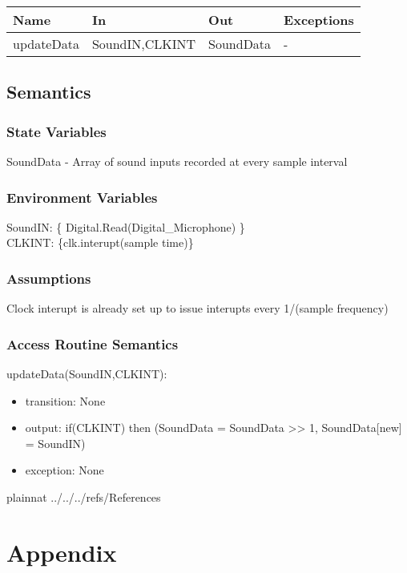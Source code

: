 \documentclass[12pt, titlepage]{article}
\begin{document}
\begin{center}
\begin{tabular}{p{2cm} p{4cm} p{4cm} p{2cm}}
\hline
\textbf{Name} & \textbf{In} & \textbf{Out} & \textbf{Exceptions} \\
\hline
updateData & SoundIN,CLKINT & SoundData & - \\
\hline
\end{tabular}
\end{center}

\subsection{Semantics}

\subsubsection{State Variables}

SoundData - Array of sound inputs recorded at every sample interval

\subsubsection{Environment Variables}

SoundIN: \{ Digital.Read(Digital\_Microphone) \}\\
CLKINT: \{clk.interupt(sample time)\}

\subsubsection{Assumptions}

Clock interupt is already set up to issue interupts every 1/(sample frequency) 

\subsubsection{Access Routine Semantics}

\noindent updateData(SoundIN,CLKINT):
\begin{itemize}
\item transition: None
\item output: if(CLKINT) then (SoundData = SoundData >> 1, SoundData[new] = SoundIN)
\item exception: None 
\end{itemize}


\newpage


 {plainnat}
 {../../../refs/References}

\section{Appendix} \label{Appendix}

\end{document}
